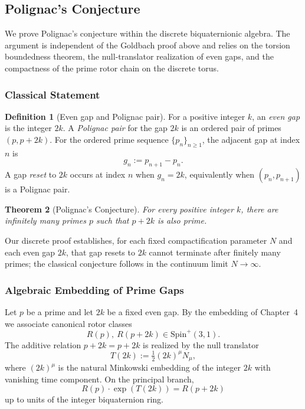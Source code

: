 \documentclass[dvipdfmx,a4paper]{article}
\newtheorem{theorem}{Theorem}[section]
\theoremstyle{definition}
\newtheorem{definition}[theorem]{Definition}
\theoremstyle{remark}
\begin{document}
\subsection{Polignac's Conjecture}

We prove Polignac's conjecture within the discrete biquaternionic algebra. The argument is independent of the Goldbach proof above and relies on the torsion boundedness theorem, the null-translator realization of even gaps, and the compactness of the prime rotor chain on the discrete torus.

\subsubsection{Classical Statement}

\begin{definition}[Even gap and Polignac pair]
\label{def:polignac-pair}
For a positive integer \( k \), an \emph{even gap} is the integer \( 2k \). A \emph{Polignac pair} for the gap \( 2k \) is an ordered pair of primes \( (p, p + 2k) \). For the ordered prime sequence \( \{p_n\}_{n \geq 1} \), the adjacent gap at index \( n \) is
\[
g_n := p_{n+1} - p_n.
\]
A gap \emph{reset} to \( 2k \) occurs at index \( n \) when \( g_n = 2k \), equivalently when \( (p_n, p_{n+1}) \) is a Polignac pair.
\end{definition}

\begin{theorem}[Polignac's Conjecture]
\label{thm:polignac-classical}
For every positive integer \( k \), there are infinitely many primes \( p \) such that \( p + 2k \) is also prime.
\end{theorem}

Our discrete proof establishes, for each fixed compactification parameter \( N \) and each even gap \( 2k \), that gap resets to \( 2k \) cannot terminate after finitely many primes; the classical conjecture follows in the continuum limit \( N \to \infty \).

\subsubsection{Algebraic Embedding of Prime Gaps}

Let \( p \) be a prime and let \( 2k \) be a fixed even gap. By the embedding of Chapter~4 we associate canonical rotor classes
\[
R(p),\ R(p + 2k) \in \mathrm{Spin}^+(3,1).
\]
The additive relation \( p + 2k = p + 2k \) is realized by the null translator
\[
T(2k) := \tfrac12 (2k)^\mu N_\mu,
\]
where \( (2k)^\mu \) is the natural Minkowski embedding of the integer \( 2k \) with vanishing time component. On the principal branch,
\[
R(p) \cdot \exp(T(2k)) = R(p + 2k)
\]
up to units of the integer biquaternion ring.
\end{document}
